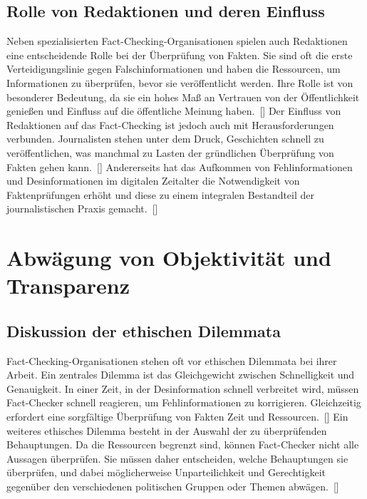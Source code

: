 \documentclass[a4paper,listof=totoc,bibliography=totoc]{scrartcl}
\begin{document}
\subsection{Rolle von Redaktionen und deren Einfluss}

Neben spezialisierten Fact-Checking-Organisationen spielen auch Redaktionen eine entscheidende Rolle 
bei der Überprüfung von Fakten. Sie sind oft die erste Verteidigungslinie gegen Falschinformationen 
und haben die Ressourcen, um Informationen zu überprüfen, bevor sie veröffentlicht werden. Ihre Rolle 
ist von besonderer Bedeutung, da sie ein hohes Maß an Vertrauen von der Öffentlichkeit genießen und 
Einfluss auf die öffentliche Meinung haben.~[\cite{graves2018}] 
\newline
\newline
Der Einfluss von Redaktionen auf das Fact-Checking ist jedoch auch mit Herausforderungen verbunden. 
Journalisten stehen unter dem Druck, Geschichten schnell zu veröffentlichen, was manchmal zu Lasten 
der gründlichen Überprüfung von Fakten gehen kann.~[\cite{nyhan2010}] Andererseits hat das Aufkommen 
von Fehlinformationen und Desinformationen im digitalen Zeitalter die Notwendigkeit von Faktenprüfungen 
erhöht und diese zu einem integralen Bestandteil der journalistischen Praxis gemacht.~[\cite{wardle2017}]


\section{Abwägung von Objektivität und Transparenz}

\subsection{Diskussion der ethischen Dilemmata}

Fact-Checking-Organisationen stehen oft vor ethischen Dilemmata bei ihrer Arbeit. Ein zentrales Dilemma 
ist das Gleichgewicht zwischen Schnelligkeit und Genauigkeit. In einer Zeit, in der Desinformation schnell 
verbreitet wird, müssen Fact-Checker schnell reagieren, um Fehlinformationen zu korrigieren. Gleichzeitig 
erfordert eine sorgfältige Überprüfung von Fakten Zeit und Ressourcen.~[\cite{amazeen2018}] 
\newline
Ein weiteres ethisches Dilemma besteht in der Auswahl der zu überprüfenden Behauptungen. Da die Ressourcen 
begrenzt sind, können Fact-Checker nicht alle Aussagen überprüfen. Sie müssen daher entscheiden, welche 
Behauptungen sie überprüfen, und dabei möglicherweise Unparteilichkeit und Gerechtigkeit gegenüber den 
verschiedenen politischen Gruppen oder Themen abwägen.~[\cite{graves2016}] 
\end{document}
